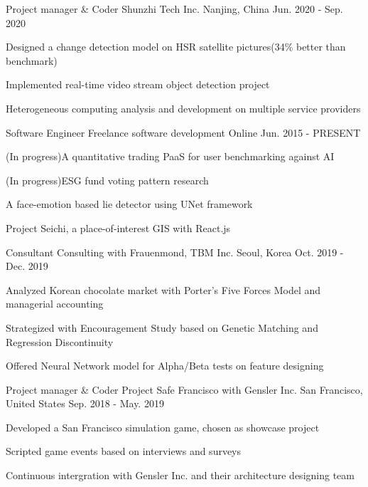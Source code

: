 \begin{cventries}
  \cventry
    {Project manager \& Coder}
    {Shunzhi Tech Inc.}
    {Nanjing, China}
    {Jun. 2020 - Sep. 2020}
    {
      \begin{cvitems}
        \item {Designed a change detection model on HSR satellite pictures(34\% better than benchmark)}
        \item {Implemented real-time video stream object detection project}
        \item {Heterogeneous computing analysis and development on multiple service providers}
      \end{cvitems}
    }

  \cventry
    {Software Engineer}
    {Freelance software development}
    {Online}
    {Jun. 2015 - PRESENT}
    {
      \begin{cvitems}
        \item {(In progress)A quantitative trading PaaS for user benchmarking against AI}
        \item {(In progress)ESG fund voting pattern research}
        \item {A face-emotion based lie detector using UNet framework}
        \item {Project Seichi, a place-of-interest GIS with React.js}
      \end{cvitems}
    }

  \cventry
    {Consultant}
    {Consulting with Frauenmond, TBM Inc.}
    {Seoul, Korea}
    {Oct. 2019 - Dec. 2019}
    {
      \begin{cvitems}
        \item {Analyzed Korean chocolate market with Porter's Five Forces Model and managerial accounting}
        \item {Strategized with Encouragement Study based on Genetic Matching and Regression Discontinuity}
        \item {Offered Neural Network model for Alpha/Beta tests on feature designing}
      \end{cvitems}
    }

  \cventry
    {Project manager \& Coder}
    {Project Safe Francisco with Gensler Inc.}
    {San Francisco, United States}
    {Sep. 2018 - May. 2019}
    {
      \begin{cvitems}
        \item {Developed a San Francisco simulation game, chosen as showcase project}
        \item {Scripted game events based on interviews and surveys}
        \item {Continuous intergration with Gensler Inc. and their architecture designing team}
      \end{cvitems}
    }


\end{cventries}
